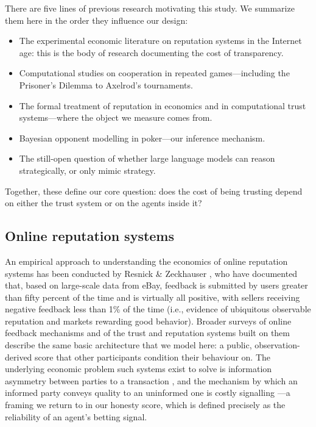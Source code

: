 \documentclass[10pt,twocolumn,letterpaper]{article}
\begin{document}
There are five lines of previous research motivating this study. We
summarize them here in the order they influence our design:
\begin{itemize}\itemsep2pt
  \item The experimental economic literature on reputation systems in
  the Internet age: this is the body of research documenting the cost
  of transparency.
  \item Computational studies on cooperation in repeated
  games---including the Prisoner's Dilemma to Axelrod's tournaments.
  \item The formal treatment of reputation in economics and in
  computational trust systems---where the object we measure comes from.
  \item Bayesian opponent modelling in poker---our inference mechanism.
  \item The still-open question of whether large language models can
  reason strategically, or only mimic strategy.
\end{itemize}
Together, these define our core question: does the cost of being
trusting depend on either the trust system or on the agents inside
it?

\subsection{Online reputation systems}
An empirical approach to understanding the economics of online
reputation systems has been conducted by Resnick \& Zeckhauser
\citep{resnick2002trust}, who have documented that, based on
large-scale data from eBay, feedback is submitted by users greater
than fifty percent of the time and is virtually all positive, with
sellers receiving negative feedback less than 1\% of the time (i.e.,
evidence of ubiquitous observable reputation and markets rewarding
good behavior). Broader surveys of online feedback mechanisms
\citep{dellarocas2003digitization} and of the trust and reputation
systems built on them \citep{josang2007survey} describe the same
basic architecture that we model here: a public, observation-derived
score that other participants condition their behaviour on. The
underlying economic problem such systems exist to solve is
information asymmetry between parties to a transaction
\citep{akerlof1970market}, and the mechanism by which an informed
party conveys quality to an uninformed one is costly signalling
\citep{spence1973job}---a framing we return to in our honesty score,
which is defined precisely as the reliability of an agent's
betting signal.
\end{document}
